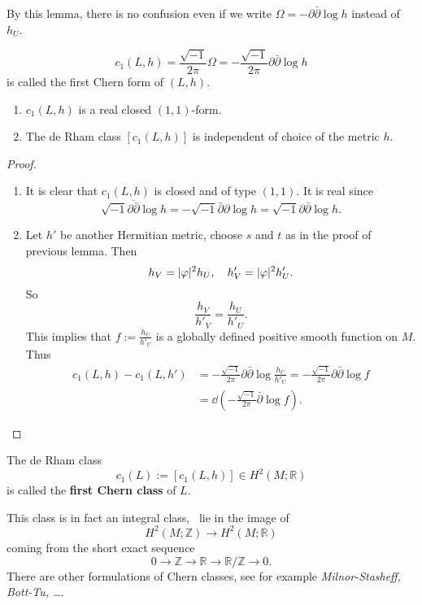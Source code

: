 \documentclass[12pt]{article}
\begin{document}
By this lemma, there is no confusion even if we write \(\Omega=-\partial\bar{\partial}
\log h\) instead of \(h_U\).

\begin{definition}
  \[
    c_1(L,h)=\frac{\sqrt{-1}}{2\pi}\Omega=-\frac{\sqrt{-1}}{2\pi}\partial\bar{\partial}
    \log h
  \] is called the first Chern form of \((L,h)\).
\end{definition}
\begin{theorem}\hfill
\begin{enumerate}[(1)]
\item \(c_1(L,h)\) is a real closed \((1,1)\)-form.
\item The de Rham class \([c_1(L,h)]\) is independent of choice of the metric \(h\).
\end{enumerate}
\end{theorem}
\begin{proof}
\begin{enumerate}[(1)]
\item It is clear that \(c_1(L,h)\) is closed and of type \((1,1)\). It is real since
  \[
    \overline{\sqrt{-1}\partial\bar{\partial}\log h}=-\sqrt{-1}\bar{\partial}\partial 
    \log h=\sqrt{-1}\partial\bar{\partial}\log h
  .\] 
\item Let \(h'\) be another Hermitian metric, choose \(s\) and \(t\) as in the proof
  of previous lemma. Then \[
    h_V=|\varphi|^2 h_U,\quad h'_V=|\varphi|^2h'_U
  .\] So \[
    \frac{h_V}{h'_V}=\frac{h_U}{h'_U}
  .\] This implies that \(f:=\frac{h_U}{h'_U}\) is a globally defined positive
  smooth function on \(M\). Thus 
  \begin{align*}
    c_1(L,h)-c_1(L,h')&=-\frac{\sqrt{-1}}{2\pi}\partial\bar{\partial}\log
    \frac{h_U}{h'_U}=-\frac{\sqrt{-1}}{2\pi}\partial\bar{\partial}\log f\\
    &=\dd\left(-\frac{\sqrt{-1}}{2\pi}\bar{\partial}\log f\right)
  .\end{align*}
\end{enumerate}
\end{proof}

\begin{definition}
  The de Rham class \[
    c_1(L):=[c_1(L,h)] \in H^2(M;\mathbb{R})
  \] is called the \textbf{first Chern class} of \(L\).
\end{definition}
\begin{remark}
  This class is in fact an integral class, \ie\ lie in the image of \[
    H^2(M;\mathbb{Z})\longrightarrow H^2(M;\mathbb{R})
  \] coming from the short exact sequence \[
    0\to \mathbb{Z}\to \mathbb{R}\to \mathbb{R}/\mathbb{Z}\to 0
  .\] There are other formulations of Chern classes, see for example
  \emph{Milnor-Stasheff, Bott-Tu, \ldots}.
\end{remark}
\end{document}
